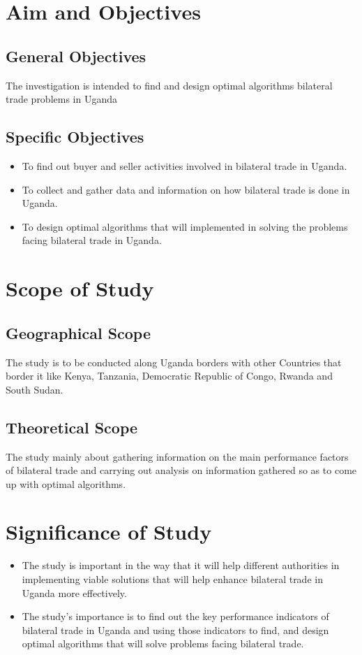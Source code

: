 \documentclass[12pt,a4paper]{article}
\begin{document}
\section{Aim and Objectives}
\subsection{General Objectives}
The investigation is intended to find and design optimal algorithms bilateral trade problems in Uganda
\subsection{Specific Objectives}
\begin{itemize}
\item To find out buyer and seller activities involved in bilateral trade in Uganda.
\item To collect and gather data and information on how bilateral trade is done in Uganda.
\item To design optimal algorithms that will implemented in solving the problems facing bilateral trade in Uganda.
\end{itemize}

\section{Scope of Study}
\subsection{Geographical Scope}
The study is to be conducted along Uganda borders with other Countries that border it like Kenya, Tanzania, Democratic Republic of Congo, Rwanda and South Sudan.

\subsection{Theoretical Scope}
The study mainly about gathering information on the main performance factors of bilateral trade and carrying out analysis on information gathered so as to come up with optimal algorithms.

\section{Significance of Study}
\begin{itemize}
\item The study is important in the way that it will help different authorities in implementing viable solutions that will help enhance bilateral trade in Uganda more effectively.
\item The study’s importance is to find out the key performance indicators of bilateral trade in Uganda and using those indicators to find, and design optimal algorithms that will solve problems facing bilateral trade.
\end{itemize}
\end{document}
